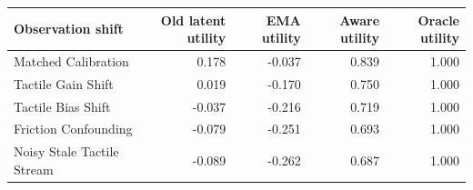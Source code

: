 \begin{tabular}{lrrrr}
\toprule
Observation shift & Old latent utility & EMA utility & Aware utility & Oracle utility \\
\midrule
Matched Calibration & 0.178 & -0.037 & 0.839 & 1.000 \\
Tactile Gain Shift & 0.019 & -0.170 & 0.750 & 1.000 \\
Tactile Bias Shift & -0.037 & -0.216 & 0.719 & 1.000 \\
Friction Confounding & -0.079 & -0.251 & 0.693 & 1.000 \\
Noisy Stale Tactile Stream & -0.089 & -0.262 & 0.687 & 1.000 \\
\bottomrule
\end{tabular}
